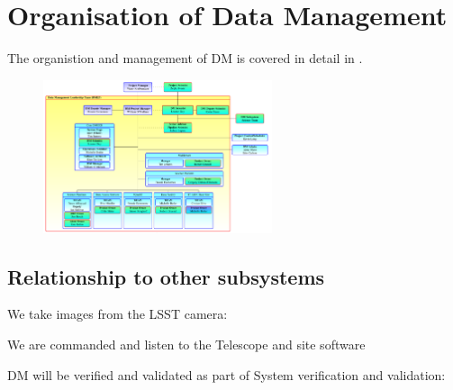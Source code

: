 
\section{Organisation of Data Management} \label{sec:org}

The organistion and management of DM is covered in detail in \cite{LDM-294}.


\begin{figure}
\includegraphics[width=0.6\textwidth]{images/DmOrg}
\caption{\label{fig:org}}
\end{figure}


\subsection{Relationship to other subsystems}
   We take images from the  LSST camera: \cite{2010SPIE.7735E..0JK}

   We are commanded and listen to the  Telescope  and site software  \cite{2014SPIE.9145E..1AG}


   DM will be verified and validated as part of System verification and validation: \cite{2014SPIE.9150E..0NS}

